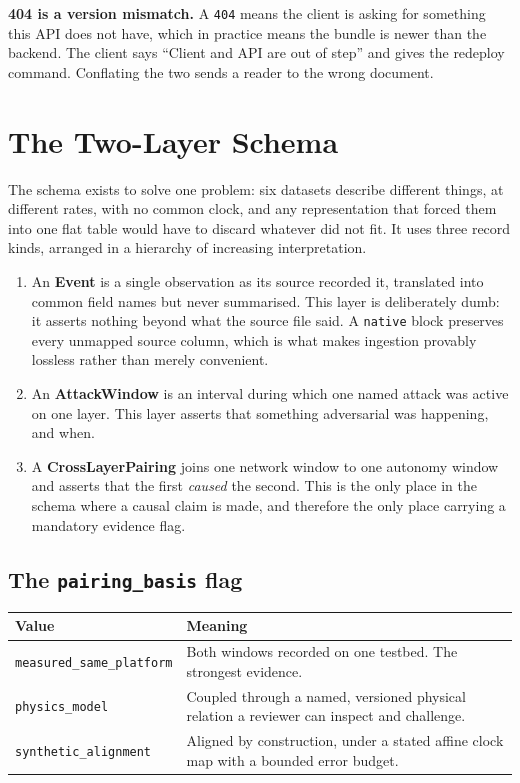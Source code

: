 \documentclass[11pt,a4paper]{article}
\newcommand{\code}[1]{\texttt{#1}}
\begin{document}
\textbf{404 is a version mismatch.} A \code{404} means the client is asking for
something this API does not have, which in practice means the bundle is newer
than the backend. The client says ``Client and API are out of step'' and gives
the redeploy command. Conflating the two sends a reader to the wrong document.

\section{The Two-Layer Schema}
\label{sec:schema}

The schema exists to solve one problem: six datasets describe different things,
at different rates, with no common clock, and any representation that forced
them into one flat table would have to discard whatever did not fit. It uses
three record kinds, arranged in a hierarchy of increasing interpretation.

\begin{enumerate}[leftmargin=1.6em]
\item An \textbf{Event} is a single observation as its source recorded it,
translated into common field names but never summarised. This layer is
deliberately dumb: it asserts nothing beyond what the source file said. A
\code{native} block preserves every unmapped source column, which is what makes
ingestion provably lossless rather than merely convenient.
\item An \textbf{AttackWindow} is an interval during which one named attack was
active on one layer. This layer asserts that something adversarial was
happening, and when.
\item A \textbf{CrossLayerPairing} joins one network window to one autonomy
window and asserts that the first \emph{caused} the second. This is the only
place in the schema where a causal claim is made, and therefore the only place
carrying a mandatory evidence flag.
\end{enumerate}

\subsection{The \code{pairing\_basis} flag}
\begin{table}[H]
\centering\small
\begin{tabularx}{\linewidth}{@{}p{4.2cm}X@{}}
\toprule
\textbf{Value} & \textbf{Meaning} \\
\midrule
\code{measured\_same\_platform} & Both windows recorded on one testbed. The strongest evidence. \\
\code{physics\_model} & Coupled through a named, versioned physical relation a reviewer can inspect and challenge. \\
\code{synthetic\_alignment} & Aligned by construction, under a stated affine clock map with a bounded error budget. \\
\bottomrule
\end{tabularx}
\end{table}
\end{document}
